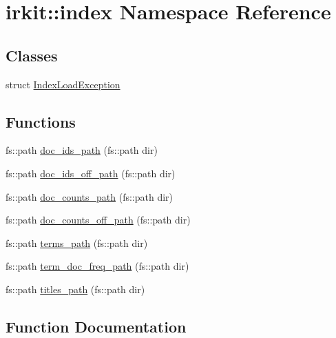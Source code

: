\hypertarget{namespaceirkit_1_1index}{}\section{irkit\+:\+:index Namespace Reference}
\label{namespaceirkit_1_1index}
\subsection*{Classes}
\begin{DoxyCompactItemize}
\item 
struct \hyperlink{structirkit_1_1index_1_1IndexLoadException}{Index\+Load\+Exception}
\end{DoxyCompactItemize}
\subsection*{Functions}
\begin{DoxyCompactItemize}
\item 
fs\+::path \hyperlink{namespaceirkit_1_1index_aab3491ded0cd4660b55f6c8f8c289428}{doc\+\_\+ids\+\_\+path} (fs\+::path dir)
\item 
fs\+::path \hyperlink{namespaceirkit_1_1index_a86d50e7aaf2bbdebf3e7a71623f4706e}{doc\+\_\+ids\+\_\+off\+\_\+path} (fs\+::path dir)
\item 
fs\+::path \hyperlink{namespaceirkit_1_1index_a5146ae382a6daf964681a09c55cdce93}{doc\+\_\+counts\+\_\+path} (fs\+::path dir)
\item 
fs\+::path \hyperlink{namespaceirkit_1_1index_a161f08dc57d21f41a9c03c7f97646e76}{doc\+\_\+counts\+\_\+off\+\_\+path} (fs\+::path dir)
\item 
fs\+::path \hyperlink{namespaceirkit_1_1index_ad05e7b96e9fec4cb7f93df6ea934c063}{terms\+\_\+path} (fs\+::path dir)
\item 
fs\+::path \hyperlink{namespaceirkit_1_1index_a28db3dab0a7fd926c5a4e6a4d37755c3}{term\+\_\+doc\+\_\+freq\+\_\+path} (fs\+::path dir)
\item 
fs\+::path \hyperlink{namespaceirkit_1_1index_a556d5fca1ddd33b4c09cd470ad7f9861}{titles\+\_\+path} (fs\+::path dir)
\end{DoxyCompactItemize}


\subsection{Function Documentation}
\mbox{\label{namespaceirkit_1_1index_a161f08dc57d21f41a9c03c7f97646e76}} 
